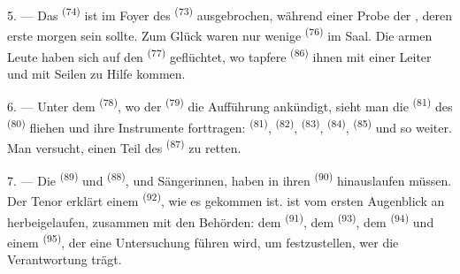 \VUsaut{5.0mm}
\VUsaut{3.4mm}

5. --- Das  \textsuperscript{(74)} ist im Foyer des 
\textsuperscript{(73)} ausgebrochen, während einer Probe der , deren
erste  morgen sein sollte. Zum Glück waren nur wenige
 \textsuperscript{(76)} im Saal. Die armen Leute haben sich auf den
 \textsuperscript{(77)} geflüchtet, wo tapfere
 \textsuperscript{(86)} ihnen mit einer Leiter und mit Seilen
zu Hilfe kommen.

6. --- Unter dem  \textsuperscript{(78)}, wo der 
\textsuperscript{(79)} die Aufführung ankündigt, sieht man die 
\textsuperscript{(81)} des  \textsuperscript{(80)} fliehen und ihre
Instrumente forttragen:  \textsuperscript{(81)}, 
\textsuperscript{(82)},  \textsuperscript{(83)}, 
\textsuperscript{(84)},  \textsuperscript{(85)} und so weiter. Man
versucht, einen Teil des  \textsuperscript{(87)} zu retten.

7. --- Die  \textsuperscript{(89)} und
 \textsuperscript{(88)},  und Sängerinnen,
haben in ihren  \textsuperscript{(90)} hinauslaufen müssen. Der
Tenor erklärt einem  \textsuperscript{(92)}, wie es gekommen ist.
 ist vom ersten Augenblick an herbeigelaufen, zusammen mit den
Behörden: dem  \textsuperscript{(91)}, dem
 \textsuperscript{(93)}, dem 
\textsuperscript{(94)} und einem 
\textsuperscript{(95)}, der eine Untersuchung führen wird, um festzustellen, wer die
Verantwortung trägt.
\VUsaut{6.0mm}
\VUfilet{22mm}
